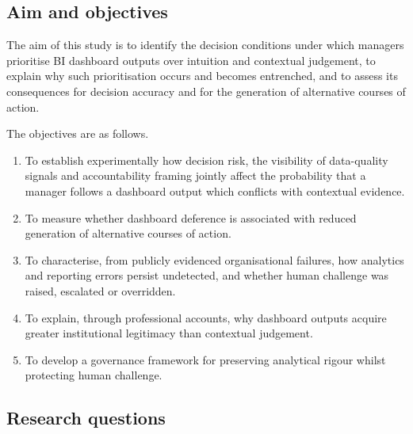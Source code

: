 \documentclass[11pt,a4paper]{article}
\numberwithin{figure}{section}
\numberwithin{table}{section}
\begin{document}
\subsection{Aim and objectives}

The aim of this study is to identify the decision conditions under which managers prioritise BI dashboard
outputs over intuition and contextual judgement, to explain why such prioritisation occurs and becomes
entrenched, and to assess its consequences for decision accuracy and for the generation of alternative
courses of action.

The objectives are as follows.

\begin{enumerate}[leftmargin=*,itemsep=2pt,topsep=4pt]
\item To establish experimentally how decision risk, the visibility of data-quality signals and
accountability framing jointly affect the probability that a manager follows a dashboard output which
conflicts with contextual evidence.
\item To measure whether dashboard deference is associated with reduced generation of alternative courses
of action.
\item To characterise, from publicly evidenced organisational failures, how analytics and reporting errors
persist undetected, and whether human challenge was raised, escalated or overridden.
\item To explain, through professional accounts, why dashboard outputs acquire greater institutional
legitimacy than contextual judgement.
\item To develop a governance framework for preserving analytical rigour whilst protecting human challenge.
\end{enumerate}

\subsection{Research questions}
\end{document}
